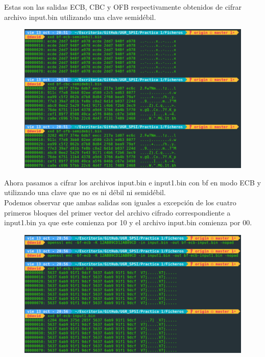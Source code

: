 \documentclass[10pt,a4paper,spanish]{report}
\begin{document}
\newpage
\noindent
Estas son las salidas ECB, CBC y OFB respectivamente obtenidos de cifrar archivo input.bin utilizando una clave semidébil.

\begin{figure}[!hbp]
 \centering  \includegraphics[width=1\textwidth]{./Imagenes/19.png}
\end{figure}

\noindent
Ahora pasamos a cifrar los archivos input.bin e input1.bin con bf en modo ECB y utilizando una clave que no es ni débil ni semidébil. \\

\noindent
Podemos observar que ambas salidas son iguales a excepción de los cuatro primeros bloques del primer vector del archivo cifrado correspondiente a input1.bin ya que este comienza por 10 y el archivo input.bin comienza por 00.

\begin{figure}[!hbp]
 \centering  \includegraphics[width=1\textwidth]{./Imagenes/20.png}
\end{figure}
\end{document}
